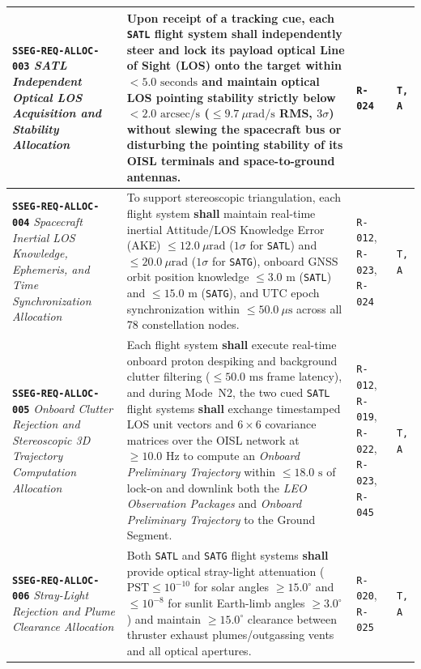 \documentclass[11pt,a4paper]{article}
\providecommand{\abbr}[1]{#1}
\begin{document}
{\begin{longtable}{|>{\raggedright\arraybackslash}p{}|>{\raggedright\arraybackslash}p{}|>{\raggedright\arraybackslash}p{}|>{\raggedright\arraybackslash}p{}|}
\textbf{\texttt{SSEG-REQ-ALLOC-003}} \newline \emph{SATL Independent Optical LOS Acquisition and Stability Allocation} & Upon receipt of a tracking cue, each \texttt{SATL} flight system \textbf{shall} independently steer and lock its payload optical Line of Sight (\abbr{LOS}) onto the target within $< 5.0\text{ seconds}$ and maintain optical \abbr{LOS} pointing stability strictly below $< 2.0\text{ arcsec/s}$ ($\le 9.7~\mu\mathrm{rad/s}$ RMS, $3\sigma$) without slewing the spacecraft bus or disturbing the pointing stability of its \abbr{OISL} terminals and space-to-ground antennas. & \texttt{R-024} & \texttt{T, A} \\ \hline
\textbf{\texttt{SSEG-REQ-ALLOC-004}} \newline \emph{Spacecraft Inertial LOS Knowledge, Ephemeris, and Time Synchronization Allocation} & To support stereoscopic triangulation, each flight system \textbf{shall} maintain real-time inertial Attitude/\abbr{LOS} Knowledge Error (\abbr{AKE}) $\le 12.0~\mu\mathrm{rad}$ ($1\sigma$ for \texttt{SATL}) and $\le 20.0~\mu\mathrm{rad}$ ($1\sigma$ for \texttt{SATG}), onboard \abbr{GNSS} orbit position knowledge $\le 3.0\text{ m}$ (\texttt{SATL}) and $\le 15.0\text{ m}$ (\texttt{SATG}), and UTC epoch synchronization within $\le 50.0~\mu\mathrm{s}$ across all 78 constellation nodes. & \texttt{R-012}, \texttt{R-023}, \texttt{R-024} & \texttt{T, A} \\ \hline
\textbf{\texttt{SSEG-REQ-ALLOC-005}} \newline \emph{Onboard Clutter Rejection and Stereoscopic 3D Trajectory Computation Allocation} & Each flight system \textbf{shall} execute real-time onboard proton despiking and background clutter filtering ($\le 50.0\text{ ms}$ frame latency), and during Mode~N2, the two cued \texttt{SATL} flight systems \textbf{shall} exchange timestamped \abbr{LOS} unit vectors and $6 \times 6$ covariance matrices over the \abbr{OISL} network at $\ge 10.0\text{ Hz}$ to compute an \emph{Onboard Preliminary Trajectory} within $\le 18.0\text{ s}$ of lock-on and downlink both the \emph{LEO Observation Packages} and \emph{Onboard Preliminary Trajectory} to the Ground Segment. & \texttt{R-012}, \texttt{R-019}, \texttt{R-022}, \texttt{R-023}, \texttt{R-045} & \texttt{T, A} \\ \hline
\textbf{\texttt{SSEG-REQ-ALLOC-006}} \newline \emph{Stray-Light Rejection and Plume Clearance Allocation} & Both \texttt{SATL} and \texttt{SATG} flight systems \textbf{shall} provide optical stray-light attenuation ($\text{PST} \le 10^{-10}$ for solar angles $\ge 15.0^\circ$ and $\le 10^{-8}$ for sunlit Earth-limb angles $\ge 3.0^\circ$) and maintain $\ge 15.0^\circ$ clearance between thruster exhaust plumes/outgassing vents and all optical apertures. & \texttt{R-020}, \newline \texttt{R-025} & \texttt{T, A} \\ \hline

\end{longtable}}
\end{document}
